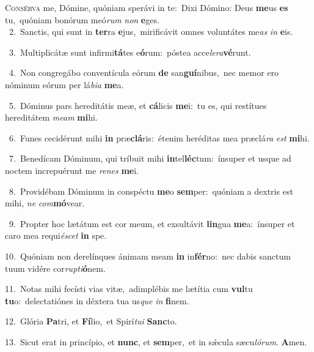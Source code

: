 \lettrine{\initial\textcolor{\initialcolor}{C}}{onsérva} me, Dómine, quóniam sperávi in te:~\dagger Dixi Dómino: Deus \textbf{me}\-us \textbf{es} tu,~\star quóniam bonórum meó\textit{rum} \textit{non} \textbf{e}\-ges.\\
{\numbfont\textcolor{\numbcolor}{~2.}}~Sanctis, qui sunt in \textbf{ter}\-ra \textbf{e}\-jus,~\star mirificávit omnes voluntátes me\textit{as} \textit{in} \textbf{e}\-is.\par
{\numbfont\textcolor{\numbcolor}{~3.}}~Multiplicátæ sunt infirmi\-\textbf{tá}\-tes e\-\textbf{ó}\-rum:~\star póstea acce\-\textit{le}\-\textit{ra}\textbf{vé}runt.\par
{\numbfont\textcolor{\numbcolor}{~4.}}~Non congregábo conventícula eórum \textbf{de} san\-\textbf{guí}\-nibus,~\star nec memor ero nóminum eórum per lá\-\textit{bi}\-\textit{a} \textbf{me}\-a.\par
{\numbfont\textcolor{\numbcolor}{~5.}}~Dóminus pars hereditátis meæ, et \textbf{cá}\-licis \textbf{me}\-i:~\star tu es, qui restítues hereditátem \textit{me}\-\textit{am} \textbf{mi}\-hi.\par
{\numbfont\textcolor{\numbcolor}{~6.}}~Funes cecidérunt mihi \textbf{in} præ\-\textbf{clá}\-ris:~\star étenim heréditas mea præclá\textit{ra} \textit{est} \textbf{mi}\-hi.\par
{\numbfont\textcolor{\numbcolor}{~7.}}~Benedícam Dóminum, qui tríbuit mihi \textbf{in}\-tel\-\textbf{léc}\-tum:~\star ínsuper et usque ad noctem increpuérunt me \textit{re}\-\textit{nes} \textbf{me}\-i.\par
{\numbfont\textcolor{\numbcolor}{~8.}}~Providébam Dóminum in conspéctu \textbf{me}\-o \textbf{sem}\-per:~\star quóniam a dextris est mihi, \textit{ne} \textit{com}\-\textbf{mó}vear.\par
{\numbfont\textcolor{\numbcolor}{~9.}}~Propter hoc lætátum est cor meum, et exsultávit \textbf{lin}\-gua \textbf{me}\-a:~\star ínsuper et caro mea requi\-\textit{é}\-\textit{scet} \textbf{in} spe.\par
{\numbfont\textcolor{\numbcolor}{10.}}~Quóniam non derelínques ánimam meam \textbf{in} in\-\textbf{fér}\-no:~\star nec dabis sanctum tuum vidére cor\-\textit{rup}\-\textit{ti}\textbf{ó}nem.\par
{\numbfont\textcolor{\numbcolor}{11.}}~Notas mihi fecísti vias vitæ,~\dagger adimplébis me lætítia cum \textbf{vul}\-tu \textbf{tu}\-o:~\star delectatiónes in déxtera tua us\textit{que} \textit{in} \textbf{fi}\-nem.\par
{\numbfont\textcolor{\numbcolor}{12.}}~Glória \textbf{Pa}\-tri, et \textbf{Fí}\-lio,~\star et Spirí\-\textit{tu}\-\textit{i} \textbf{Sanc}\-to.\par
{\numbfont\textcolor{\numbcolor}{13.}}~Sicut erat in princípio, et \textbf{nunc}\-, et \textbf{sem}\-per,~\star et in sǽcula sæcu\-\textit{ló}\-\textit{rum}. \textbf{A}\-men.\par
